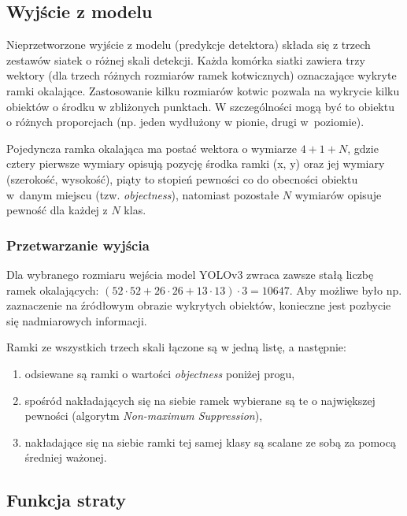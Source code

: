 \documentclass{article}
\begin{document}
\FloatBarrier

\subsection{Wyjście z modelu}

Nieprzetworzone wyjście z modelu (predykcje detektora) składa się z trzech zestawów siatek o różnej skali detekcji. Każda komórka siatki zawiera trzy wektory (dla trzech różnych rozmiarów ramek kotwicznych) oznaczające wykryte ramki okalające. Zastosowanie kilku rozmiarów kotwic pozwala na wykrycie kilku obiektów o środku w zbliżonych punktach. W szczególności mogą być to obiektu o różnych proporcjach (np. jeden wydłużony w pionie, drugi w~poziomie).

Pojedyncza ramka okalająca ma postać wektora o wymiarze \(4+1+N\), gdzie cztery pierwsze wymiary opisują pozycję środka ramki (x, y) oraz jej wymiary (szerokość, wysokość), piąty to stopień pewności co do obecności obiektu w~danym miejscu (tzw. \textit{objectness}), natomiast pozostałe \(N\) wymiarów opisuje pewność dla każdej z \(N\) klas.

\subsubsection{Przetwarzanie wyjścia}

Dla wybranego rozmiaru wejścia model YOLOv3 zwraca zawsze stałą liczbę ramek okalających: \((52\cdot52 + 26\cdot26 + 13\cdot13)\cdot3 = 10647\). Aby możliwe było np. zaznaczenie na źródłowym obrazie wykrytych obiektów, konieczne jest pozbycie się nadmiarowych informacji.

Ramki ze wszystkich trzech skali łączone są w jedną listę, a następnie:

\begin{enumerate}
    \item odsiewane są ramki o wartości \textit{objectness} poniżej progu,
    \item spośród nakładających się na siebie ramek wybierane są te o największej pewności (algorytm \textit{Non-maximum Suppression}),
    \item nakładające się na siebie ramki tej samej klasy są scalane ze sobą za pomocą średniej ważonej.
\end{enumerate}

\subsection{Funkcja straty}
\end{document}
